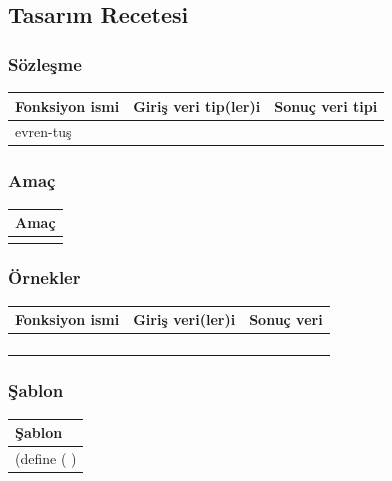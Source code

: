 \documentclass[12pt, a4paper]{article}
\newcommand\fillin[1][3cm]{\makebox[#1]{\dotfill}}
\begin{document}


\newpage
\subsection*{Tasarım Recetesi}
\subsubsection*{Sözleşme}
\begin{tabular}{| p{4cm} | p{8cm} | p{4cm} |  }
\hline			
Fonksiyon ismi&Giriş veri tip(ler)i&Sonuç veri tipi\\
\hline
evren-tuş& & \\[10ex]
\hline  
\end{tabular}

\subsubsection*{Amaç}
\begin{tabular}{| p{17cm} |  }
\hline			
Amaç\\
\hline
 \\[10ex]
\hline  
\end{tabular}

\subsubsection*{Örnekler}
\begin{tabular}{| p{4cm} | p{8cm} | p{4cm} |  }
\hline			
Fonksiyon ismi&Giriş veri(ler)i&Sonuç veri\\
\hline
& & \\[6ex]
\hline  
& & \\[6ex]
\hline  
& & \\[6ex]
\hline  
& & \\[6ex]
\hline  
\end{tabular}

\subsubsection*{Şablon}
\begin{tabular}{| p{17cm} |  }
\hline			
Şablon\\
\hline
\vspace{0,2cm}
(define (\fillin[2cm] \hspace{1cm}  \fillin[8cm] ) \\[30ex]
\hline  
\end{tabular}
\end{document}
